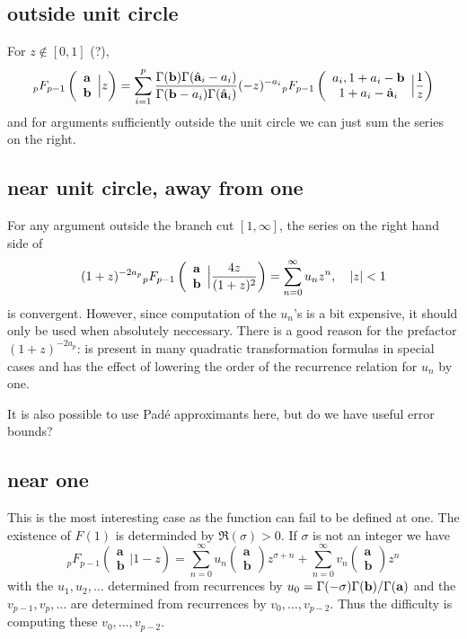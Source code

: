 \documentclass[10pt]{article}
\numberwithin{equation}{section}
\newcommand{\F}[5] {{}_{#1}F_{#2} \left( \begin{array}{c} #3 \\ #4 \end{array} \Big| #5  \right)}
\begin{document}
\subsection{outside unit circle}
For $z \not \in [0,1]$ (?),
\begin{equation*}
\F{p}{p-1}{\bold{a}}{\bold{b}}{z} = \sum_{i=1}^{p} \frac{\Gamma(\bold{b}) \Gamma(\hat{\bold{a}}_i-a_i)}{\Gamma(\bold{b}-a_i) \Gamma(\hat{\bold{a}}_i)} (-z)^{-a_i} \F{p}{p-1}{a_i,1+a_i-\bold{b}}{1+a_i-\hat{\bold{a}}_i}{\frac{1}{z}}
\end{equation*}
and for arguments sufficiently outside the unit circle we can just sum the series on the right.

\subsection{near unit circle, away from one}
For any argument outside the branch cut $[1,\infty]$, the series on the right hand side of
\begin{equation*}
(1+z)^{-2 a_p} \F{p}{p-1}{\bold{a}}{\bold{b}}{\frac{4 z}{(1+z)^2}} = \sum_{n=0}^{\infty}u_n z^n, \quad |z| < 1
\end{equation*}
is convergent. However, since computation of the $u_n$'s is a bit expensive, it should only be used when absolutely neccessary. There is a good reason for the prefactor $(1+z)^{-2a_p}$: is present in many quadratic transformation formulas in special cases and has the effect of lowering the order of the recurrence relation for $u_n$ by one.

It is also possible to use Pad\'e approximants here, but do we have useful error bounds?

\subsection{near one}

This is the most interesting case as the function can fail to be defined at one. The existence of $F(1)$ is determinded by $\Re(\sigma)> 0$. If $\sigma$ is not an integer we have
\begin{equation}
\label{nearone}
\F{p}{p-1}{\mathbf{a}}{\mathbf{b}}{1-z} = \sum_{n=0}^{\infty} u_n \left(\begin{array}{c} \mathbf{a}\\\mathbf{b}\end{array} \right) z^{\sigma+n} + \sum_{n=0}^{\infty} v_n \left(\begin{array}{c} \mathbf{a}\\\mathbf{b}\end{array} \right) z^n
\end{equation}
with the $u_1,u_2,\dots$ determined from recurrences by $u_0 = \Gamma(-\sigma)\Gamma(\bold{b})/\Gamma(\bold{a})$ and the $v_{p-1}, v_p, \dots$ are determined from recurrences by $v_0, \dots, v_{p-2}$. Thus the difficulty is computing these $v_0, \dots, v_{p-2}$.
\end{document}
